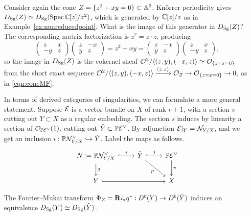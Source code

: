 \begin{example}{}{}
    Consider again the cone $Z=\{z^2+xy=0\}\subset\mathbb{A}^3$. Kn\"orrer periodicity
    gives $D_{\mathrm{Sg}}(Z)\simeq D_{\mathrm{Sg}}(\operatorname{Spec}\mathbb{C}[z]/z^2)$, which is generated by
    $\mathbb{C}[z]/z$ as in Example~\ref{ex:nonreducedpoint}. What is the image of this
    generator in $D_{\mathrm{Sg}}(Z)$? The corresponding matrix factorization is
    $z^2=z\cdot z$, producing
    \begin{equation*}
        \begin{pmatrix}
            z & x \\ -y & z
        \end{pmatrix}\begin{pmatrix}
            z & -x \\ y & z
        \end{pmatrix} = z^2+xy = \begin{pmatrix}
            z & -x \\ y & z
        \end{pmatrix}\begin{pmatrix}
            z & x \\ -y & z
        \end{pmatrix},
    \end{equation*}
    so the image in $D_{\mathrm{Sg}}(Z)$ is the cokernel sheaf
    $\mathcal{O}^2/\langle(z,y),(-x,z)\rangle\simeq\mathcal{O}_{\{z=x=0\}}$ from the short exact
    sequence $\mathcal{O}^2/\langle(z,y),(-x,z)\rangle\xrightarrow{(z\;x)}\mathcal{O}_Z
    \to\mathcal{O}_{\{z=x=0\}}\to0$, as in \eqref{eqn:coneMF}.
\end{example}

In terms of derived categories of singularities, we can formulate a more general
statement. Suppose $\mathcal{E}$ is a vector bundle on $X$ of rank $r+1$, with a
section $s$ cutting out $Y\subset X$ as a regular embedding. The section $s$
induces by linearity a section of $\mathcal{O}_{\mathbb{P}\mathcal{E}^\vee}(1)$, cutting out
$\tilde Y\subset\mathbb{P}\mathcal{E}^\vee$. By adjunction $\mathcal{E}|_Y=\mathcal{N}_{Y/X}$, and we get
an inclusion $i:\mathbb{P}\mathcal{N}^\vee_{Y/X}\hookrightarrow\tilde Y$. Label the maps as
follows.
\begin{equation*}
    \begin{tikzcd}
        N\coloneqq\P\calN_{Y/X}^\vee \ar[d,"q"] \ar[r,hook,"i"] &
        \tilde Y \ar[r,hook,"j"] \ar[dr,"p"'] &
        \P\calE^\vee \ar[d,"\pi"] \\
        Y \ar[rr,hook] & & X
    \end{tikzcd}
\end{equation*}

\begin{theorem}{\cite[Thm 2.1]{OrlovKnorrer}}{}
    The Fourier--Mukai transform $\Phi_Z=\mathbf{R} i_*q^*:D^b(Y)\to D^b(\tilde Y)$
    induces an equivalence $D_{\mathrm{Sg}}(Y)\simeq D_{\mathrm{Sg}}(\tilde Y)$.
\end{theorem}

